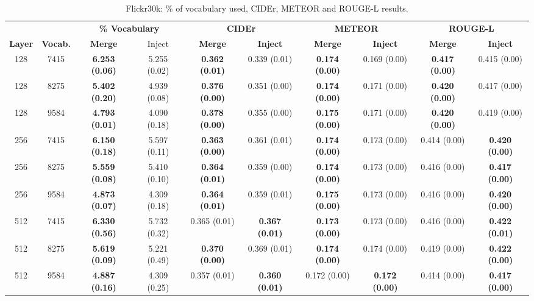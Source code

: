 \documentclass[11pt,letterpaper]{article}
\begin{document}
\begin{table*}[!t]
\begin{scriptsize}
\begin{subtable}{\textwidth}
  \centering
  \begin{tabular}{|cc|cc|cc|cc|cc|}
  \hline
& & \multicolumn{2}{|c|}{\bf \% Vocabulary} & \multicolumn{2}{|c|}{\bf CIDEr} & \multicolumn{2}{|c|}{\bf METEOR} & \multicolumn{2}{|c|}{\bf ROUGE-L} \\
  \bf Layer & \bf Vocab. & \bf Merge & Inject & \bf Merge & \bf Inject & \bf Merge & \bf Inject & \bf Merge & \bf Inject \\
  \hline
  128	& 7415	& \bf 6.253 (0.06)	& 5.255 (0.02)	& \bf 0.362 (0.01)	& 0.339 (0.01)	& \bf 0.174 (0.00)	& 0.169 (0.00)	& \bf 0.417 (0.00)	& 0.415 (0.00) \\
  128	& 8275	& \bf 5.402 (0.20)	& 4.939 (0.08)	& \bf 0.376 (0.00)	& 0.351 (0.00)	& \bf 0.174 (0.00)	& 0.171 (0.00)	& \bf 0.420 (0.00)	& 0.417 (0.00) \\
  128	& 9584	& \bf 4.793 (0.01)	& 4.090 (0.18)	& \bf 0.378 (0.00)	& 0.355 (0.00)	& \bf 0.175 (0.00)	& 0.171 (0.00)	& \bf 0.420 (0.00)	& 0.419 (0.00) \\
  \hline
  256	& 7415	& \bf 6.150 (0.18)	& 5.597 (0.11)	& \bf 0.363 (0.00)	& 0.361 (0.01)	& \bf 0.174 (0.00)	& 0.173 (0.00)	& 0.414 (0.00)	& \bf 0.420 (0.00) \\
  256	& 8275	& \bf 5.559 (0.08)	& 5.410 (0.10)	& \bf 0.364 (0.01)	& 0.359 (0.00)	& \bf 0.174 (0.00)	& 0.173 (0.00)	& 0.416 (0.00)	& \bf 0.417 (0.00) \\
  256	& 9584	& \bf 4.873 (0.07)	& 4.309 (0.18)	& \bf 0.364 (0.01)	& 0.359 (0.01)	& \bf 0.175 (0.00)	& 0.173 (0.00)	& 0.416 (0.00)	& \bf 0.420 (0.00) \\
  \hline
  512	& 7415	& \bf 6.330 (0.56)	& 5.732 (0.32)	& 0.365 (0.01)	& \bf 0.367 (0.01)	& \bf 0.173 (0.00)	& 0.173 (0.00)	& 0.416 (0.00)	& \bf 0.422 (0.01) \\
  512	& 8275	& \bf 5.619 (0.09)	& 5.221 (0.49)	& \bf 0.370 (0.00)	& 0.369 (0.01)	& \bf 0.174 (0.00)	& 0.174 (0.00)	& 0.419 (0.00)	& \bf 0.422 (0.00) \\
  512	& 9584	& \bf 4.887 (0.16)	& 4.309 (0.25)	& 0.357 (0.01)	& \bf 0.360 (0.01)	& 0.172 (0.00)	& \bf 0.172 (0.00)	& 0.414 (0.00)	& \bf 0.417 (0.00) \\
  \hline
  \end{tabular}
  \caption{\label{tbl:results_flickr30k_1} Flickr30k: \% of vocabulary used, CIDEr, METEOR and ROUGE-L results.}
\end{subtable}
\vspace{10pt}


\end{scriptsize}
\end{table*}
\end{document}

